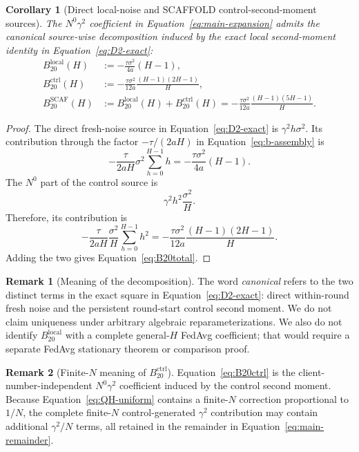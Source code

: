 \documentclass[11pt]{article}
\newtheorem{corollary}[corollary]{Corollary}
\theoremstyle{definition}
\newtheorem{remark}[remark]{Remark}
\begin{document}
\begin{corollary}[Direct local-noise and SCAFFOLD control-second-moment sources]
\label{cor:decomp}
The $N^0\gamma^2$ coefficient in Equation~\eqref{eq:main-expansion} admits the canonical source-wise decomposition induced by the exact local second-moment identity in Equation~\eqref{eq:D2-exact}:
\begin{align}
  B_{20}^{\mathrm{local}}(H)
  &:=-\frac{\tau\sigma^2}{4a}(H-1),                                  \label{eq:B20local}\\
  B_{20}^{\mathrm{ctrl}}(H)
  &:=-\frac{\tau\sigma^2}{12a}
  \frac{(H-1)(2H-1)}{H},                                               \label{eq:B20ctrl}\\
  B_{20}^{\mathrm{SCAF}}(H)
  &:=B_{20}^{\mathrm{local}}(H)+B_{20}^{\mathrm{ctrl}}(H)
  =-\frac{\tau\sigma^2}{12a}
  \frac{(H-1)(5H-1)}{H}.                                               \label{eq:B20total}
\end{align}
\end{corollary}

\begin{proof}
The direct fresh-noise source in Equation~\eqref{eq:D2-exact} is $\gamma^2h\sigma^2$. Its contribution through the factor $-\tau/(2aH)$ in Equation~\eqref{eq:b-assembly} is
\[
  -\frac\tau{2aH}\sigma^2\sum_{h=0}^{H-1}h
  =-\frac{\tau\sigma^2}{4a}(H-1).
\]
The $N^0$ part of the control source is
\[
  \gamma^2h^2\frac{\sigma^2}{H}.
\]
Therefore, its contribution is
\[
  -\frac\tau{2aH}\frac{\sigma^2}{H}
  \sum_{h=0}^{H-1}h^2
  =-\frac{\tau\sigma^2}{12a}
  \frac{(H-1)(2H-1)}{H}.
\]
Adding the two gives Equation~\eqref{eq:B20total}.
\end{proof}

\begin{remark}[Meaning of the decomposition]
The word \emph{canonical} refers to the two distinct terms in the exact square in Equation~\eqref{eq:D2-exact}: direct within-round fresh noise and the persistent round-start control second moment. We do not claim uniqueness under arbitrary algebraic reparameterizations. We also do not identify $B_{20}^{\mathrm{local}}$ with a complete general-$H$ FedAvg coefficient; that would require a separate FedAvg stationary theorem or comparison proof.
\end{remark}

\begin{remark}[Finite-$N$ meaning of $B_{20}^{\mathrm{ctrl}}$]
Equation~\eqref{eq:B20ctrl} is the client-number-independent $N^0\gamma^2$ coefficient induced by the control second moment. Because Equation~\eqref{eq:QH-uniform} contains a finite-$N$ correction proportional to $1/N$, the complete finite-$N$ control-generated $\gamma^2$ contribution may contain additional $\gamma^2/N$ terms, all retained in the remainder in Equation~\eqref{eq:main-remainder}.
\end{remark}
\end{document}

